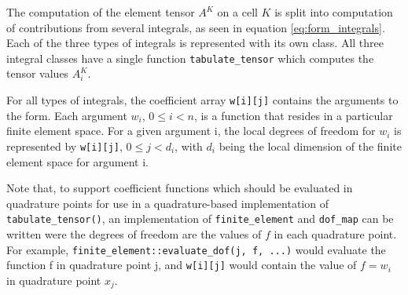 The computation of the element tensor $A^K$ on a cell $K$ is split into computation of
contributions from several integrals, as seen in equation \eqref{eq:form_integrals}.
Each of the three types of integrals is represented with its own class.
All three integral classes have a single function \texttt{tabulate\_tensor} which
computes the tensor values $A_i^K$.

For all types of integrals, the coefficient array \texttt{w[i][j]} contains the
arguments to the form. Each argument $w_i$, $0\le i<n$, is a function that resides in a 
particular finite element space. For a given argument i, the local degrees of freedom for $w_i$
is represented by \texttt{w[i][j]}, $0 \le j < d_i$, with $d_i$ being the local dimension of
the finite element space for argument i.

Note that, to support coefficient functions which should be evaluated in quadrature points
for use in a quadrature-based implementation of \texttt{tabulate\_tensor()},
an implementation of \texttt{finite\_element} and \texttt{dof\_map}
can be written were the degrees of freedom are the values of $f$ in each
quadrature point. For example, \texttt{finite\_element::evaluate\_dof(j, f, ...)}
would evaluate the function f in quadrature point j, and \texttt{w[i][j]} would contain
the value of $f=w_i$ in quadrature point $x_j$.











